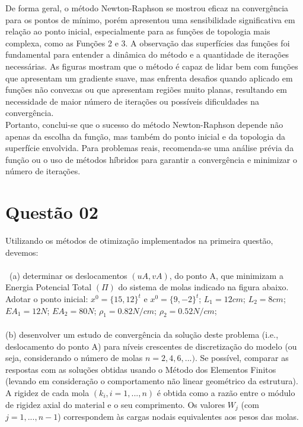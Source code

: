 \documentclass[a4paper, 12pt]{article}
\begin{document}
De forma geral, o método Newton-Raphson se mostrou eficaz na convergência para os pontos de mínimo, porém apresentou uma sensibilidade significativa em relação ao ponto inicial, especialmente para as funções de topologia mais complexa, como as Funções 2 e 3. A observação das superfícies das funções foi fundamental para entender a dinâmica do método e a quantidade de iterações necessárias. As figuras mostram que o método é capaz de lidar bem com funções que apresentam um gradiente suave, mas enfrenta desafios quando aplicado em funções não convexas ou que apresentam regiões muito planas, resultando em necessidade de maior número de iterações ou possíveis dificuldades na convergência.\\

Portanto, conclui-se que o sucesso do método Newton-Raphson depende não apenas da escolha da função, mas também do ponto inicial e da topologia da superfície envolvida. Para problemas reais, recomenda-se uma análise prévia da função ou o uso de métodos híbridos para garantir a convergência e minimizar o número de iterações.







\newpage
\section{Questão 02}

Utilizando os métodos de otimização implementados na primeira questão, devemos: \\ \\
\>\ (a) determinar os deslocamentos $(uA, vA)$, do ponto A, que minimizam a Energia Potencial Total $(\Pi)$ do sistema de molas indicado na figura abaixo. Adotar o ponto inicial: $x^0 = \{15, 12\}^t$ e $x^0 = \{9, -2\}^t$; $L_1 = 12cm$; $L_2 = 8cm$; $EA_1 = 12N$; $EA_2 = 80N$; $\rho_1 = 0.82N/cm$; $\rho_2 = 0.52N/cm$;\\ \\
(b) desenvolver um estudo de convergência da solução deste problema (i.e., deslocamento do ponto A) para níveis crescentes de discretização do modelo (ou seja, considerando o número de molas $n = 2, 4, 6,...)$.
Se possível, comparar as respostas com as soluções obtidas usando o Método dos Elementos Finitos (levando em consideração o comportamento não linear geométrico da estrutura). A rigidez de cada mola $(k_i, i = 1,..., n)$ é obtida como a razão entre o módulo de rigidez axial do material e o seu comprimento. Os valores $W_j$ (com $j = 1,...,n-1$) correspondem às cargas nodais equivalentes aos pesos
das molas.
\end{document}
